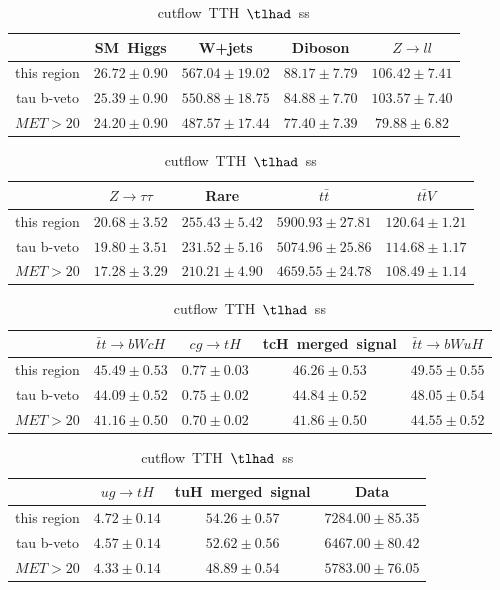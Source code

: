\begin{table}
\footnotesize
\caption{cutflow~TTH~$\tlhad$~ss}
\centering
\begin{tabular}{|c|c|c|c|c|} \hline
 & SM~Higgs & W+jets & Diboson & $Z\to ll$\\\hline
this region & $26.72\pm0.90$ & $567.04\pm19.02$ & $88.17\pm7.79$ & $106.42\pm7.41$\\\hline
tau b-veto & $25.39\pm0.90$ & $550.88\pm18.75$ & $84.88\pm7.70$ & $103.57\pm7.40$\\\hline
$MET>20$ & $24.20\pm0.90$ & $487.57\pm17.44$ & $77.40\pm7.39$ & $79.88\pm6.82$\\\hline
\end{tabular}
\begin{tabular}{|c|c|c|c|c|} \hline
 & $Z\to \tau\tau$ & Rare & $t\bar{t}$ & $t\bar{t}V$\\\hline
this region & $20.68\pm3.52$ & $255.43\pm5.42$ & $5900.93\pm27.81$ & $120.64\pm1.21$\\\hline
tau b-veto & $19.80\pm3.51$ & $231.52\pm5.16$ & $5074.96\pm25.86$ & $114.68\pm1.17$\\\hline
$MET>20$ & $17.28\pm3.29$ & $210.21\pm4.90$ & $4659.55\pm24.78$ & $108.49\pm1.14$\\\hline
\end{tabular}
\begin{tabular}{|c|c|c|c|c|} \hline
 & $\bar{t}t\to bWcH$ & $cg\to tH$ & tcH~merged~signal & $\bar{t}t\to bWuH$\\\hline
this region & $45.49\pm0.53$ & $0.77\pm0.03$ & $46.26\pm0.53$ & $49.55\pm0.55$\\\hline
tau b-veto & $44.09\pm0.52$ & $0.75\pm0.02$ & $44.84\pm0.52$ & $48.05\pm0.54$\\\hline
$MET>20$ & $41.16\pm0.50$ & $0.70\pm0.02$ & $41.86\pm0.50$ & $44.55\pm0.52$\\\hline
\end{tabular}
\begin{tabular}{|c|c|c|c|} \hline
 & $ug\to tH$ & tuH~merged~signal & Data\\\hline
this region & $4.72\pm0.14$ & $54.26\pm0.57$ & $7284.00\pm85.35$\\\hline
tau b-veto & $4.57\pm0.14$ & $52.62\pm0.56$ & $6467.00\pm80.42$\\\hline
$MET>20$ & $4.33\pm0.14$ & $48.89\pm0.54$ & $5783.00\pm76.05$\\\hline
\end{tabular}
\label{tab:cutflow_reg1l1tau1b3j_ss}
\end{table}
